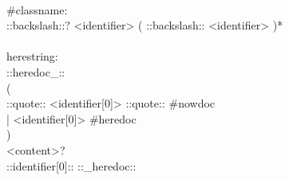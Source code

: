 \begin{bigbigpre}
 \\
#classname: \\
    ::backslash::? <identifier> ( ::backslash:: <identifier> )* \\
 \\
herestring: \\
    ::heredoc_:: \\
    ( \\
        ::quote:: <identifier[0]> ::quote:: #nowdoc \\
      | <identifier[0]>                     #heredoc \\
    ) \\
    <content>? \\
    ::identifier[0]:: ::_heredoc::
\end{bigbigpre}
